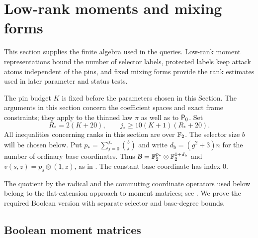 \section{Low-rank moments and mixing forms}\label{sec:moments}

This section supplies the finite algebra used in the queries.
Low-rank moment representations bound the number of selector labels,
protected labels keep attack atoms independent of the pins, and fixed
mixing forms provide the rank estimates used in later parameter and
status tests.

The pin budget $K$ is fixed before the parameters chosen in this
Section.  The arguments in this section concern the coefficient spaces and
exact frame constraints; they apply to the thinned law $\pi$ as well as
to ${\mathsf P_0}$.  Set
\begin{equation}\label{eq:moment-parameters}
 R_*=2(K+20),\qquad
 j_*\ge 10(K+1)(R_*+20).
\end{equation}
All inequalities concerning ranks in this section are over $\mathbb F_2$.
The selector size $b$ will be chosen below.  Put
$p_*=\sum_{j=0}^{j_*}\binom bj$ and write $d_{\mathrm b}=(g^2+3)n$ for the
number of ordinary base coordinates.  Thus
$\mathcal B=\mathbb F_2^{p_*}\otimes\mathbb F_2^{1+d_{\mathrm b}}$ and
$v(s,z)=p_s\otimes(1,z)$, as in .
The constant base coordinate has index $0$.

The quotient by the radical and the commuting coordinate operators
used below belong to the flat-extension approach to moment matrices;
see \citet{laurentmourrain2009}. We prove the required Boolean
version with separate selector and base-degree bounds.

\subsection{Boolean moment matrices}

